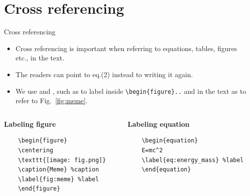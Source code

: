 \section{Cross referencing}
\label{sec:referencing}
\frame[plain]{\sectionpage}

\begin{frame}[fragile]{Cross referencing}
\begin{itemize}
    \item<1-> Cross referencing is important when referring to equations, tables, figures etc., in the text.
    \item<2-> The readers can point to eq.(2) instead to writing it again.
    \item<3-> We use  and , such as  to label inside \texttt{\textbackslash begin\{figure\}..} and in the text as  to refer to Fig.~\ref{fig:meme}.
\end{itemize}
\begin{columns}
    \begin{column}{0.4\textwidth}
    \textbf{Labeling figure}
           \begin{small}
         \begin{verbatim}
    \begin{figure} 
    \centering 
    \texttt{[image: fig.png]} 
    \caption{Meme} %caption
    \label{fig:meme} %label
    \end{figure}
    \end{verbatim}
    \end{small}  
    \end{column}
       \begin{column}{0.4\textwidth}
       \textbf{Labeling equation}
           \begin{small}
         \begin{verbatim}
    \begin{equation} 
    E=mc^2
    \label{eq:energy_mass} %label
    \end{equation}
    \end{verbatim}
    \end{small}  
    \end{column}
\end{columns}
  
\end{frame}

